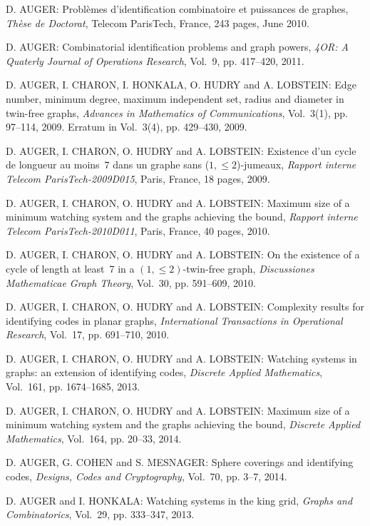 \begin{thebibliography}{999}
D. AUGER: Probl\`emes d'identification combinatoire et puissances de graphes, {\it Th\`ese de Doctorat}, Telecom ParisTech, France, 243 pages, June 2010.

D. AUGER: Combinatorial identification problems and graph powers, {\it 4OR: A Quaterly Journal of Operations Research}, Vol.~9, pp. 417--420, 2011.

D. AUGER, I. CHARON, I. HONKALA, O. HUDRY and A. LOBSTEIN: Edge number, minimum degree, maximum independent set, radius and diameter in twin-free graphs, {\it Advances in Mathematics of Communications}, Vol.~3(1), pp. 97--114, 2009. Erratum in Vol.~3(4), pp. 429--430, 2009.

D. AUGER, I. CHARON, O. HUDRY and A. LOBSTEIN: Existence d'un cycle de longueur au moins~$7$ dans un graphe sans ($1,\leq 2$)-jumeaux, {\it Rapport interne Telecom ParisTech-2009D015}, Paris, France, 18 pages, 2009.

D. AUGER, I. CHARON, O. HUDRY and A. LOBSTEIN: Maximum size of a minimum watching system and the graphs achieving the bound, {\it Rapport interne Telecom ParisTech-2010D011}, Paris, France, 40 pages, 2010.

D. AUGER, I. CHARON, O. HUDRY and A. LOBSTEIN: On the existence of a cycle of length at least~7 in a $(1,\leq 2)$-twin-free graph, {\it Discussiones Mathematicae Graph Theory}, Vol.~30, pp. 591--609, 2010.

D. AUGER, I. CHARON, O. HUDRY and A. LOBSTEIN: Complexity results for identifying codes in planar graphs, {\it International Transactions in Operational Research}, Vol.~17, pp. 691--710, 2010.

D. AUGER, I. CHARON, O. HUDRY and A. LOBSTEIN: Watching systems in graphs: an extension of identifying codes, {\it Discrete Applied Mathematics}, Vol.~161, pp. 1674--1685, 2013.

D. AUGER, I. CHARON, O. HUDRY and A. LOBSTEIN: Maximum size of a minimum watching system and the graphs achieving the bound, {\it Discrete Applied Mathematics}, Vol.~164, pp. 20--33, 2014.

D. AUGER, G. COHEN and S. MESNAGER: Sphere coverings and identifying codes, {\it Designs, Codes and Cryptography}, Vol.~70, pp. 3--7, 2014.

D. AUGER and I. HONKALA: Watching systems in the king grid, {\it Graphs and Combinatorics}, Vol.~29, pp. 333--347, 2013.


\end{thebibliography}
